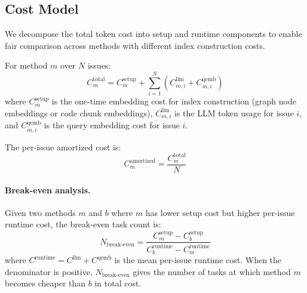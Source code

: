 \subsection{Cost Model}
\label{sec:cost_model}

We decompose the total token cost into setup and runtime components to enable fair comparison across methods with different index construction costs.

For method $m$ over $N$ issues:
\begin{equation}
\label{eq:total_cost}
C_m^{\text{total}} = C_m^{\text{setup}} + \sum_{i=1}^{N}\left(C_{m,i}^{\text{llm}} + C_{m,i}^{\text{qemb}}\right)
\end{equation}
where $C_m^{\text{setup}}$ is the one-time embedding cost for index construction (graph node embeddings or code chunk embeddings), $C_{m,i}^{\text{llm}}$ is the LLM token usage for issue $i$, and $C_{m,i}^{\text{qemb}}$ is the query embedding cost for issue $i$.

The per-issue amortized cost is:
\begin{equation}
\label{eq:amortized_cost}
C_m^{\text{amortized}} = \frac{C_m^{\text{total}}}{N}
\end{equation}

\paragraph{Break-even analysis.}
Given two methods $m$ and $b$ where $m$ has lower setup cost but higher per-issue runtime cost, the break-even task count is:
\begin{equation}
\label{eq:breakeven}
N_{\text{break-even}} = \frac{C_m^{\text{setup}} - C_b^{\text{setup}}}{C_b^{\text{runtime}} - C_m^{\text{runtime}}}
\end{equation}
where $C^{\text{runtime}} = C^{\text{llm}} + C^{\text{qemb}}$ is the mean per-issue runtime cost. When the denominator is positive, $N_{\text{break-even}}$ gives the number of tasks at which method $m$ becomes cheaper than $b$ in total cost.
